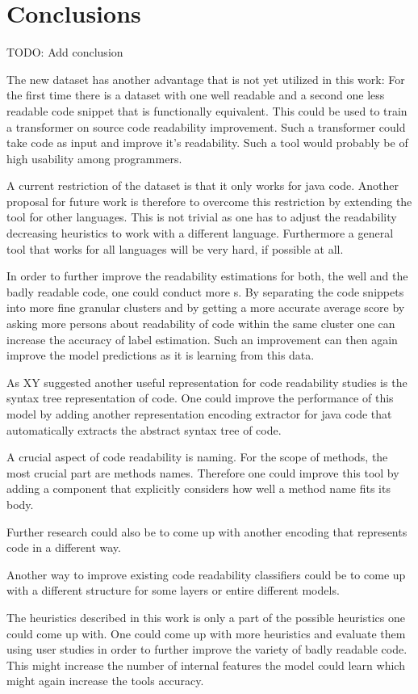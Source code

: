 \documentclass[%
class=scrreprt,
chapterprefix=false,%
open=right,%
twoside=false,%
paper=a4,%
logofile={Logo\_zentral\_farbig\_EN.png},%
thesistype=master,%
UKenglish,%
]{se2thesis}
\theoremstyle{definition}
\begin{document}
	
\section{Conclusions} \label{Conclusions}
	TODO: Add conclusion
	
	The new dataset has another advantage that is not yet utilized in this work: For the first time there is a dataset with one well readable and a second one less readable code snippet that is functionally equivalent. This could be used to train a transformer on source code readability improvement. Such a transformer could take code as input and improve it's readability. Such a tool would probably be of high usability among programmers.
	
	A current restriction of the dataset is that it only works for java code. Another proposal for future work is therefore to overcome this restriction by extending the tool for other languages. This is not trivial as one has to adjust the readability decreasing heuristics to work with a different language. Furthermore a general tool that works for all languages will be very hard, if possible at all.
	
	In order to further improve the readability estimations for both, the well and the badly readable code, one could conduct more s. By separating the code snippets into more fine granular clusters and by getting a more accurate average score by asking more persons about readability of code within the same cluster one can increase the accuracy of label estimation. Such an improvement can then again improve the model predictions as it is learning from this data.
	
	As XY suggested another useful representation for code readability studies is the syntax tree representation of code. One could improve the performance of this model by adding another representation encoding extractor for java code that automatically extracts the abstract syntax tree of code. 
	
	A crucial aspect of code readability is naming. For the scope of methods, the most crucial part are methods names. Therefore one could improve this tool by adding a component that explicitly considers how well a method name fits its body.
	
	Further research could also be to come up with another encoding that represents code in a different way.
	
	Another way to improve existing code readability classifiers could be to come up with a different structure for some layers or entire different models.
	
	The heuristics described in this work is only a part of the possible heuristics one could come up with. One could come up with more heuristics and evaluate them using user studies in order to further improve the variety of badly readable code. This might increase the number of internal features the model could learn which might again increase the tools accuracy.

	
	\backmatter
	
	\printbibliography
	
\end{document}
